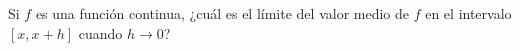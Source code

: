 \item Si $f$ es una función continua, ¿cuál es el límite del valor medio de $f$ en el intervalo $[x, x + h]$ cuando $h \to 0$?
